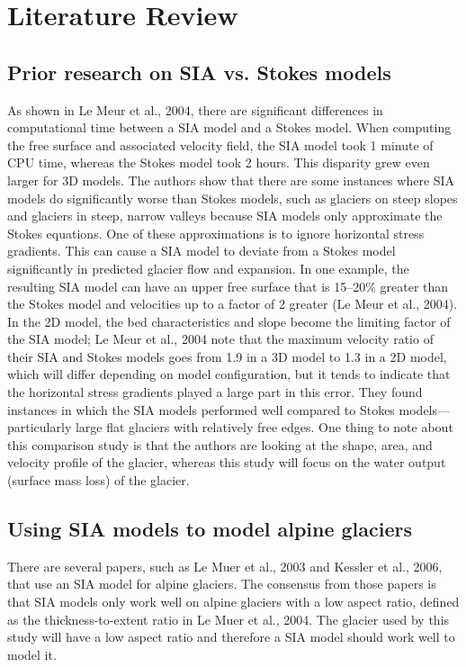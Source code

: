 \documentclass{article}
\begin{document}
\section{Literature Review}
\subsection{Prior research on SIA vs. Stokes models}
    As shown in Le Meur et al., 2004, there are significant differences in computational time between a SIA model and a Stokes model. When 
computing the free surface and associated velocity field, the SIA model took 1 minute of CPU time, whereas the Stokes model took 2 hours. 
This disparity grew even larger for 3D models. The authors show that there are some instances where SIA models do significantly worse than 
Stokes models, such as glaciers on steep slopes and glaciers in steep, narrow valleys because SIA models only approximate the Stokes 
equations. One of these approximations is to ignore horizontal stress gradients. This can cause a SIA model to deviate from a Stokes model 
significantly in predicted glacier flow and expansion. In one example, the resulting SIA model can have an upper free surface that is 
15--20\% greater than the Stokes model and velocities up to a factor of 2 greater (Le Meur et al., 2004). In the 2D model, the bed 
characteristics and slope become the limiting factor of the SIA model; Le Meur et al., 2004 note that the maximum velocity ratio of their 
SIA and Stokes models goes from 1.9 in a 3D model to 1.3 in a 2D model, which will differ depending on model configuration, but it tends to 
indicate that the horizontal stress gradients played a large part in this error. They found instances in which the SIA models performed well 
compared to Stokes models---particularly large flat glaciers with relatively free edges. One thing to note about this comparison study is 
that the authors are looking at the shape, area, and velocity profile of the glacier, whereas this study will focus on the water output 
(surface mass loss) of the glacier.
\subsection{Using SIA models to model alpine glaciers}
    There are several papers, such as Le Muer et al., 2003 and Kessler et al., 2006, that use an SIA model for alpine glaciers. The consensus 
from those papers is that SIA models only work well on alpine glaciers with a low aspect ratio, defined as the thickness-to-extent ratio in 
Le Muer et al., 2004. The glacier used by this study will have a low aspect ratio and therefore a SIA model should work well to model it.
\end{document}
